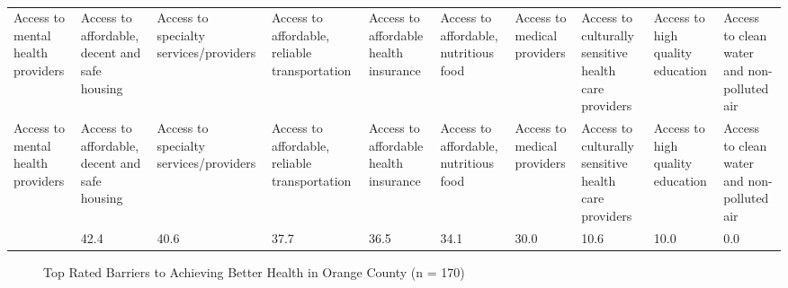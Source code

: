 \documentclass[
  english,
  letterpaper,
]{report}
\begin{document}
\begin{longtable}[]{@{}llllllllll@{}}

\caption{\label{tbl-oc-affect-health}Top Rated Issues That Affect Health
in Orange County (n = 170)}

\tabularnewline

\caption{}\label{T_21ecd}\tabularnewline
\toprule\noalign{}
Access to mental health providers & Access to affordable, decent and
safe housing & Access to specialty services/providers & Access to
affordable, reliable transportation & Access to affordable health
insurance & Access to affordable, nutritious food & Access to medical
providers & Access to culturally sensitive health care providers &
Access to high quality education & Access to clean water and
non-polluted air \\
\midrule\noalign{}
\endfirsthead
\toprule\noalign{}
Access to mental health providers & Access to affordable, decent and
safe housing & Access to specialty services/providers & Access to
affordable, reliable transportation & Access to affordable health
insurance & Access to affordable, nutritious food & Access to medical
providers & Access to culturally sensitive health care providers &
Access to high quality education & Access to clean water and
non-polluted air \\
\midrule\noalign{}
\endhead
\bottomrule\noalign{}
\endlastfoot
58.2 & 42.4 & 40.6 & 37.7 & 36.5 & 34.1 & 30.0 & 10.6 & 10.0 & 0.0 \\

\end{longtable}

\begin{figure}


\caption{\label{fig-oc-achieve-health}Top Rated Barriers to Achieving
Better Health in Orange County (n = 170)}

\end{figure}%
\end{document}
